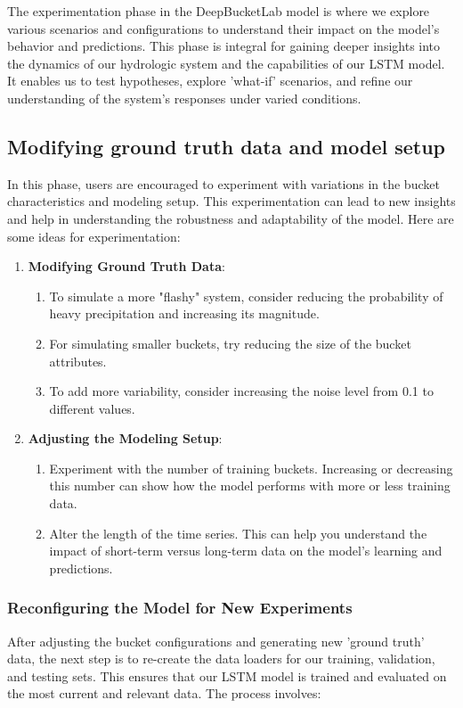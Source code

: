 \documentclass{article}
\begin{document}
The experimentation phase in the DeepBucketLab model is where we explore various scenarios and configurations to understand their impact on the model's behavior and predictions. This phase is integral for gaining deeper insights into the dynamics of our hydrologic system and the capabilities of our LSTM model. It enables us to test hypotheses, explore 'what-if' scenarios, and refine our understanding of the system's responses under varied conditions.

\subsection{Modifying ground truth data and model setup}
In this phase, users are encouraged to experiment with variations in the bucket characteristics and modeling setup. This experimentation can lead to new insights and help in understanding the robustness and adaptability of the model. Here are some ideas for experimentation:

\begin{enumerate}
    \item \textbf{Modifying Ground Truth Data}: 
    \begin{enumerate}
        \item To simulate a more "flashy" system, consider reducing the probability of heavy precipitation and increasing its magnitude. 
        \item For simulating smaller buckets, try reducing the size of the bucket attributes. \item To add more variability, consider increasing the noise level from 0.1 to different values.
    \end{enumerate}

    \item \textbf{Adjusting the Modeling Setup}: 
    \begin{enumerate}
        \item Experiment with the number of training buckets. Increasing or decreasing this number can show how the model performs with more or less training data.
        
        \item Alter the length of the time series. This can help you understand the impact of short-term versus long-term data on the model's learning and predictions.
    \end{enumerate}
\end{enumerate}

\subsubsection{Reconfiguring the Model for New Experiments}
After adjusting the bucket configurations and generating new 'ground truth' data, the next step is to re-create the data loaders for our training, validation, and testing sets. This ensures that our LSTM model is trained and evaluated on the most current and relevant data. The process involves:
\end{document}
